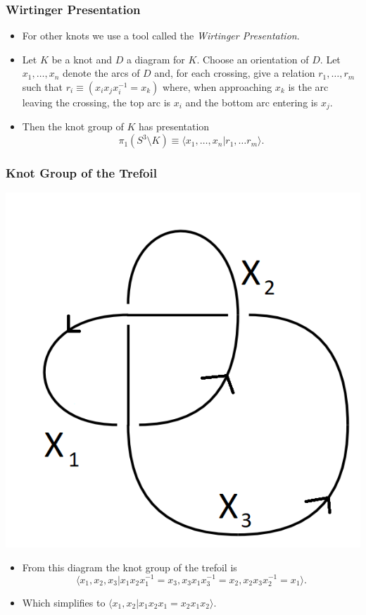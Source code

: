 \documentclass{beamer}
\begin{document}
\begin{frame}
  \frametitle{Wirtinger Presentation}
  \begin{itemize}
  \item For other knots we use a tool called the \textit{Wirtinger Presentation}.
    \pause
  \item Let $K$ be a knot and $D$ a diagram for $K$. Choose an orientation of $D$.
    Let $x_1,\ldots, x_n$ denote the arcs of $D$ and, for each crossing, give a
    relation $r_1,\ldots, r_m$ such that $r_i\equiv (x_i x_j x_i^{-1}=x_k)$ where, when approaching
    $x_k$ is the arc leaving the crossing, the top arc is $x_i$ and the bottom arc entering
    is $x_j$.
    \pause
  \item Then the knot group of $K$ has presentation
    \[
      \pi_1(S^3\setminus K) \equiv \langle x_1,\ldots, x_n| r_1,\ldots r_m\rangle.
    \]
  \end{itemize}
\end{frame}

\begin{frame}
  \frametitle{Knot Group of the Trefoil}
  \begin{center}
    \includegraphics[scale=.25]{annotated-trefoil}
  \end{center}
  \begin{itemize}
  \item From this diagram the knot group of the trefoil is 
    \[
      \langle x_1,x_2,x_3|x_1x_2x_1^{-1}=x_3,x_3x_1x_3^{-1}=x_2,x_2x_3x_2^{-1}=x_1\rangle.
    \]\pause
  \item Which simplifies to $\langle x_1,x_2|x_1 x_2 x_1= x_2 x_1 x_2\rangle$.
  \end{itemize}
\end{frame}
\end{document}
